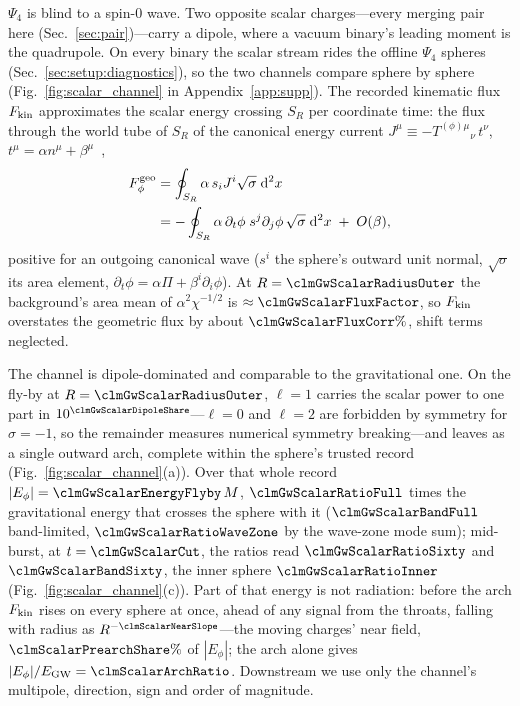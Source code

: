 \documentclass[twocolumn,floatfix,aps,prd,superscriptaddress,nofootinbib]{revtex4-2}
\begin{document}
$\Psi_4$ is blind to a spin-$0$ wave. Two opposite scalar charges---every merging pair here (Sec.~\ref{sec:pair})---carry a dipole, where a vacuum binary's leading moment is the quadrupole. On every binary the scalar stream rides the offline $\Psi_4$ spheres (Sec.~\ref{sec:setup:diagnostics}), so the two channels compare sphere by sphere (Fig.~\ref{fig:scalar_channel} in Appendix~\ref{app:supp}). The recorded kinematic flux $F_{\rm kin}$ approximates the scalar energy crossing $S_R$ per coordinate time: the flux through the world tube of $S_R$ of the canonical energy current $J^\mu\equiv-T^{(\phi)\mu}{}_{\nu}\,t^\nu$, $t^\mu=\alpha n^\mu+\beta^\mu$~\cite{clough2021,gourgoulhon2012},
\begin{equation}
\begin{split}
F^{\rm geo}_\phi&=\oint_{S_R}\alpha\,s_iJ^i\sqrt{\sigma}\;\mathrm{d}^2x\\
&=-\oint_{S_R}\alpha\,\partial_t\phi\;s^j\partial_j\phi\,\sqrt{\sigma}\;\mathrm{d}^2x\;+\;O(\beta),
\end{split}
\label{eq:scalarflux}
\end{equation}
positive for an outgoing canonical wave ($s^i$ the sphere's outward unit normal, $\sqrt{\sigma}$ its area element, $\partial_t\phi=\alpha\Pi+\beta^i\partial_i\phi$). At $R=\clmGwScalarRadiusOuter$ the background's area mean of $\alpha^2\chi^{-1/2}$ is $\approx\clmGwScalarFluxFactor$, so $F_{\rm kin}$ overstates the geometric flux by about $\clmGwScalarFluxCorr\%$, shift terms neglected.

The channel is dipole-dominated and comparable to the gravitational one. On the fly-by at $R=\clmGwScalarRadiusOuter$, $\ell=1$ carries the scalar power to one part in $10^{\clmGwScalarDipoleShare}$---$\ell=0$ and $\ell=2$ are forbidden by symmetry for $\sigma=-1$, so the remainder measures numerical symmetry breaking---and leaves as a single outward arch, complete within the sphere's trusted record (Fig.~\ref{fig:scalar_channel}(a)). Over that whole record $|E_\phi|=\clmGwScalarEnergyFlyby\,M$, $\clmGwScalarRatioFull$ times the gravitational energy that crosses the sphere with it ($\clmGwScalarBandFull$ band-limited, $\clmGwScalarRatioWaveZone$ by the wave-zone mode sum); mid-burst, at $t=\clmGwScalarCut$, the ratios read $\clmGwScalarRatioSixty$ and $\clmGwScalarBandSixty$, the inner sphere $\clmGwScalarRatioInner$ (Fig.~\ref{fig:scalar_channel}(c)). Part of that energy is not radiation: before the arch $F_{\rm kin}$ rises on every sphere at once, ahead of any signal from the throats, falling with radius as $R^{-\clmScalarNearSlope}$---the moving charges' near field, $\clmScalarPrearchShare\%$ of $|E_\phi|$; the arch alone gives $|E_\phi|/E_{\rm GW}=\clmScalarArchRatio$. Downstream we use only the channel's multipole, direction, sign and order of magnitude.
\end{document}
